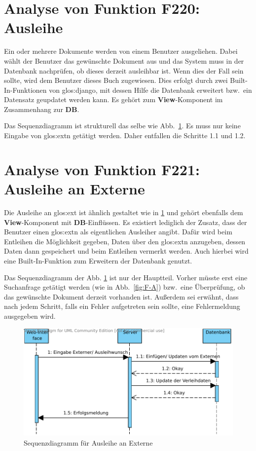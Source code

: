 \section{Analyse von Funktion F220: Ausleihe}
\label{f:220}
Ein oder mehrere Dokumente werden von einem Benutzer ausgeliehen. Dabei wählt 
der Benutzer das gewünschte Dokument aus und das System muss in der Datenbank 
nachprüfen, ob dieses derzeit ausleihbar ist. Wenn dies der Fall sein sollte, 
wird dem Benutzer dieses Buch zugewiesen. Dies erfolgt durch zwei 
Built-In-Funktionen von \gls{glos:django}, mit dessen Hilfe die Datenbank 
erweitert bzw.\ ein Datensatz geupdatet werden kann. Es gehört zum 
\textbf{View}-Komponent im Zusammenhang zur \textbf{DB}.

Das Sequenzdiagramm ist strukturell das selbe wie Abb.\ \ref{fig:221}. Es muss 
nur keine Eingabe von \gls{glos:ext}n getätigt werden. Daher entfallen die 
Schritte 1.1 und 1.2. 

\section{Analyse von Funktion F221: Ausleihe an Externe}
\label{f:221}
Die Ausleihe an \gls{glos:ext} ist ähnlich gestaltet wie in \ref{f:220} 
 und gehört ebenfalls dem \textbf{View}-Komponent mit 
\textbf{DB}-Einflüssen. Es existiert lediglich der Zusatz, dass der Benutzer 
einen \gls{glos:ext}n als eigentlichen Ausleiher angibt. Dafür wird beim 
Entleihen die Möglichkeit gegeben, Daten über den \gls{glos:ext}n anzugeben, 
dessen Daten dann gespeichert und beim Entleihen vermerkt werden. Auch hierbei 
wird eine Built-In-Funktion zum Erweitern der Datenbank genutzt.

Das Sequenzdiagramm der Abb. \ref{fig:221} ist nur der Hauptteil. Vorher müsste 
erst eine Suchanfrage getätigt werden (wie in Abb.\ \ref{fig:F-A}) bzw.\ eine 
Überprüfung, ob das gewünschte Dokument derzeit vorhanden ist. Außerdem sei 
erwähnt, dass nach jedem Schritt, falls ein Fehler aufgetreten sein sollte, eine 
Fehlermeldung ausgegeben wird.

\begin{figure}
\begin{center}
\includegraphics[width=0.8\linewidth]{bilder/Seq-Ausleihe.pdf}
\caption{Sequenzdiagramm für Ausleihe an Externe}
\label{fig:221}
\end{center}
\end{figure}

